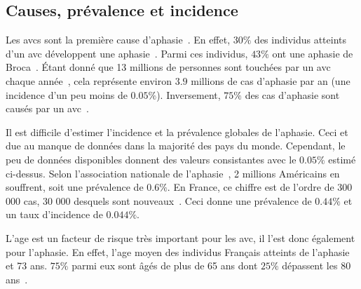 \subsection{Causes, prévalence et incidence}

Les \glspl{avc} sont la première cause d'aphasie~\cite{Hallowell_2017}.
En effet, \(30\%\) des individus atteints d'un \gls{avc} 
développent une aphasie~\cite{Flowers_Skoretz_Silver_Rochon_Fang_Flamand-Roze_Martino_2016}.
Parmi ces individus, \(43\%\) ont une aphasie de Broca~\cite{CNSA_2015}.
Étant donné que 13 millions de personnes sont touchées par un \gls{avc} 
chaque année~\cite{Smaili_Langlois_Pribil_2022},
cela représente environ \(3.9\) millions de cas d'aphasie par an (une incidence d'un peu moins de \(0.05\%\)).
Inversement, \(75\%\) des cas d'aphasie sont causés par un \gls{avc}~\cite{CNSA_2015}.

Il est difficile d'estimer l'incidence et la prévalence globales de l'aphasie.
Ceci et due au manque de données dans la majorité des pays du monde.
Cependant, le peu de données disponibles donnent des valeurs consistantes avec le \(0.05\%\) estimé ci-dessus.
Selon l'association nationale de l'aphasie~\cite{Home}, 2 millions Américains en souffrent, 
soit une prévalence de \(0.6\%\).
En France, ce chiffre est de l'ordre de 300 000 cas, 30 000 desquels sont nouveaux~\cite{CNSA_2015}.
Ceci donne une prévalence de \(0.44\%\) et un taux d'incidence de \(0.044\%\).

L'age est un facteur de risque très important pour les \gls{avc},
il l'est donc également pour l'aphasie. 
En effet, l'age moyen des individus Français atteints de l'aphasie et 73 ans.
\(75\%\) parmi eux sont âgés de plus de 65 ans dont \(25\%\) dépassent les 80 ans~\cite{CNSA_2015}.






